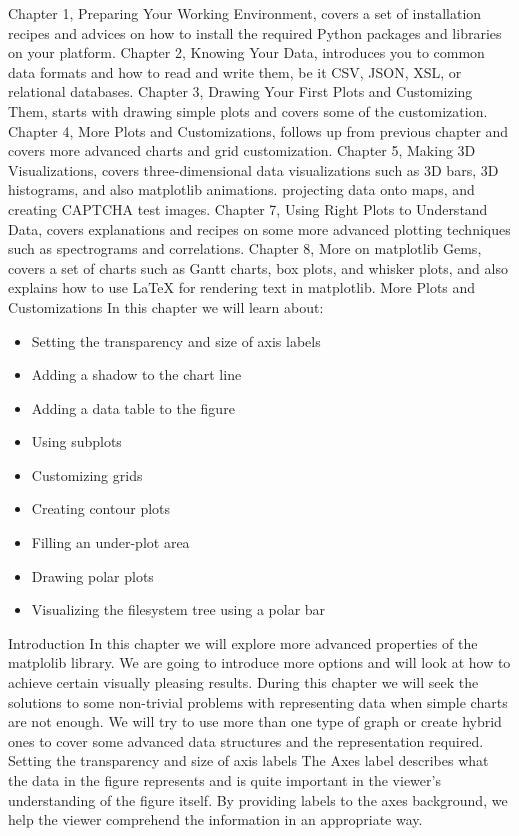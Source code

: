 Chapter 1, Preparing Your Working Environment, covers a set of installation recipes
and advices on how to install the required Python packages and libraries on
your platform.
Chapter 2, Knowing Your Data, introduces you to common data formats and how
to read and write them, be it CSV, JSON, XSL, or relational databases.
Chapter 3, Drawing Your First Plots and Customizing Them, starts with drawing
simple plots and covers some of the customization.
Chapter 4, More Plots and Customizations, follows up from previous chapter and
covers more advanced charts and grid customization.
Chapter 5, Making 3D Visualizations, covers three-dimensional data visualizations
such as 3D bars, 3D histograms, and also matplotlib animations.
\newpage %
projecting data onto maps, and creating CAPTCHA test images.
Chapter 7, Using Right Plots to Understand Data, covers explanations and recipes
on some more advanced plotting techniques such as spectrograms and correlations.
Chapter 8, More on matplotlib Gems, covers a set of charts such as Gantt charts,
box plots, and whisker plots, and also explains how to use LaTeX for rendering
text in matplotlib.
\newpage %
More Plots and Customizations
In this chapter we will learn about:
\begin{itemize}
\item Setting the transparency and size of axis labels
\item Adding a shadow to the chart line
\item Adding a data table to the figure
\item Using subplots
\item Customizing grids
\item Creating contour plots
\item Filling an under-plot area
\item Drawing polar plots
\item Visualizing the filesystem tree using a polar bar
\end{itemize}

Introduction
In this chapter we will explore more advanced properties of the matplolib library. We are going
to introduce more options and will look at how to achieve certain visually pleasing results.
During this chapter we will seek the solutions to some non-trivial problems with representing
data when simple charts are not enough. We will try to use more than one type of graph or
create hybrid ones to cover some advanced data structures and the representation required.
Setting the transparency and size of
axis labels
The Axes label describes what the data in the figure represents and is quite important in
the viewer's understanding of the figure itself. By providing labels to the axes background,
we help the viewer comprehend the information in an appropriate way.

